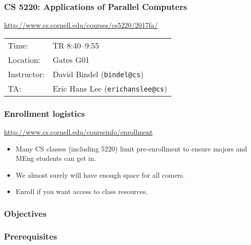 \documentclass{beamer}
\begin{document}
\begin{frame}
  \titlepage
\end{frame}

\begin{frame}
  \frametitle{CS 5220: Applications of Parallel Computers}

  \begin{center}
    {\small \url{http://www.cs.cornell.edu/courses/cs5220/2017fa/}} \\[1cm]
    \begin{tabular}{ll}
      Time:       & TR 8:40--9:55 \\
      Location:   & Gates G01 \\
      Instructor: & David Bindel ({\tt bindel@cs}) \\
      TA:         & Eric Hans Lee ({\tt erichanslee@cs})
    \end{tabular}
  \end{center}
  
\end{frame}

\begin{frame}
  \frametitle{Enrollment logistics}

  \begin{center}
    {\small \url{http://www.cs.cornell.edu/courseinfo/enrollment}}
  \end{center}

  \begin{itemize}
    \item Many CS classes (including 5220) limit pre-enrollment to
      ensure majors and MEng students can get in.
    \item We almost surely will have enough space for all comers.
    \item Enroll if you want access to class resources.
  \end{itemize}
\end{frame}

\begin{frame}
  \frametitle{Objectives}
\end{frame}

\begin{frame}
  \frametitle{Prerequisites}
\end{frame}
\end{document}
